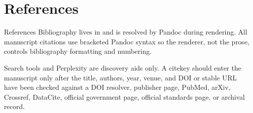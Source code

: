 \documentclass[
  ignorenonframetext,
]{beamer}
\author{\texorpdfstring{}{}}
\date{}
\begin{document}
\section{References}\label{sec:references}

\begin{frame}{References}
Bibliography lives in
\href{references.bib}{} and is
resolved by Pandoc during rendering. All manuscript citations use
bracketed Pandoc syntax so the renderer, not the prose, controls
bibliography formatting and numbering.

Search tools and Perplexity are discovery aids only. A citekey should
enter the manuscript only after the title, authors, year, venue, and DOI
or stable URL have been checked against a DOI resolver, publisher page,
PubMed, arXiv, Crossref, DataCite, official government page, official
standards page, or archival record.
\end{frame}
\end{document}
